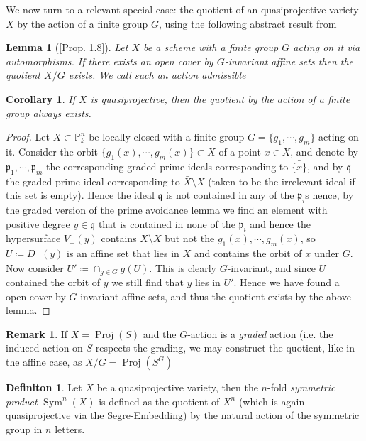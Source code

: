\documentclass[11pt, a4paper, german]{article}
\theoremstyle{plain}
\newtheorem{corollary}[theorem]{Corollary}
\newtheorem{lemma}[theorem]{Lemma}
\theoremstyle{definition}
\newtheorem{definition}[theorem]{Definiton}
\newtheorem{remark}[theorem]{Remark}
\DeclareMathOperator{\Sym}{Sym}
\DeclareMathOperator{\Proj}{Proj}
\begin{document}
We now turn to a relevant special case: the quotient of an quasiprojective variety $X$ by the action of a finite group $G$, using the following
abstract result from \cite{SGA1}

\begin{lemma}[{\cite{SGA1}[Prop. 1.8]}]    
    Let $X$ be a scheme with a finite group $G$ acting on it via automorphisms. If there exists an open cover by $G$-invariant affine sets
    then the quotient $X/G$ exists.
    We call such an action \emph{admissible}
\end{lemma}

\begin{corollary}
    If $X$ is quasiprojective, then the quotient by the action of a finite group always exists.
\end{corollary}
\begin{proof}
    Let $X \subset \mathbb{P}_k^n$ be locally closed with a finite group $G = \{g_1,\cdots,g_m\}$ acting on it. 
    Consider the orbit $\{g_1(x),\cdots,g_m(x)\} \subset X$ of a point $x \in X$, and denote by $\mathfrak{p}_1,\cdots,\mathfrak{p}_m$ the 
    corresponding graded prime ideals corresponding to $\bar{\{x\}}$, and by $\mathfrak{q}$ the graded prime ideal corresponding to
    $\bar{X} \setminus X$ (taken to be the irrelevant ideal if this set is empty). 
    Hence the ideal $\mathfrak{q}$ is not contained in any of the $\mathfrak{p}_i$s hence, by the graded version of the prime
    avoidance lemma we find an element with positive degree $y \in \mathfrak{q}$ that is contained in none of the $\mathfrak{p}_i$ and hence
    the hypersurface $V_+(y)$ contains $\bar{X} \setminus X$ but not the $g_1(x),\cdots,g_m(x)$, so $U \coloneqq D_+(y)$ 
    is an affine set that lies in $X$ and contains the orbit of $x$ under $G$. Now consider $U' \coloneq \cap_{g \in G} g(U)$. This is clearly
    $G$-invariant, and since $U$ contained the orbit of $y$ we still find that $y$ lies in $U'$. Hence we have found a open cover by
    $G$-invariant affine sets, and thus the quotient exists by the above lemma.
\end{proof}

\begin{remark}
    If $X = \Proj(S)$ and the $G$-action is a \emph{graded} action (i.e. the induced action on $S$ respects the grading, we may construct
    the quotient, like in the affine case, as $X/G = \Proj(S^G)$
\end{remark}

\begin{definition}
    Let $X$ be a quasiprojective variety, then the $n$-fold \emph{symmetric product} $\Sym^n(X)$ is defined as the quotient of $X^n$
    (which is again quasiprojective via the Segre-Embedding) by the natural action of the symmetric group in $n$ letters.
\end{definition}
\end{document}
